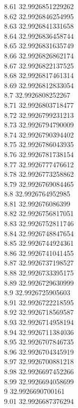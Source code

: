 {8.61	32.9926851229262\\
8.62	32.9926846254995\\
8.63	32.9926841331658\\
8.64	32.9926836458744\\
8.65	32.9926831635749\\
8.66	32.9926826862174\\
8.67	32.9926822137525\\
8.68	32.9926817461314\\
8.69	32.9926812833054\\
8.7	32.9926808252267\\
8.71	32.9926803718477\\
8.72	32.9926799231213\\
8.73	32.9926794790009\\
8.74	32.9926790394402\\
8.75	32.9926786043935\\
8.76	32.9926781738154\\
8.77	32.9926777476612\\
8.78	32.9926773258862\\
8.79	32.9926769084465\\
8.8	32.9926764952985\\
8.81	32.992676086399\\
8.82	32.9926756817051\\
8.83	32.9926752811746\\
8.84	32.9926748847654\\
8.85	32.9926744924361\\
8.86	32.9926741041455\\
8.87	32.9926737198527\\
8.88	32.9926733395175\\
8.89	32.9926729630999\\
8.9	32.9926725905603\\
8.91	32.9926722218595\\
8.92	32.9926718569587\\
8.93	32.9926714958194\\
8.94	32.9926711384036\\
8.95	32.9926707846735\\
8.96	32.9926704345919\\
8.97	32.9926700881218\\
8.98	32.9926697452266\\
8.99	32.9926694058699\\
9	32.9926690700161\\
9.01	32.9926687376294\\
}
